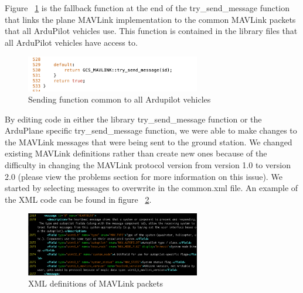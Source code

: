 \documentclass[12pt,journal,compsoc]{IEEEtran}
\begin{document}
Figure ~\ref{fallthrough} is the fallback function at the end of the try\_send\_message function that links the plane MAVLink implementation to the common MAVLink packets that all ArduPilot vehicles use. This function is contained in the library files that all ArduPilot vehicles have access to. 
\begin{figure}[h!]
\hspace*{0cm}
\centering
\includegraphics[width=3in]{Fallthrough.png}
\caption{Sending function common to all Ardupilot vehicles}
\label{fallthrough}
\end{figure}

By editing code in either the library try\_send\_message function or the ArduPlane specific try\_send\_message function, we were able to make changes to the MAVLink messages that were being sent to the ground station. 
We changed existing MAVLink definitions rather than create new ones because of the difficulty in changing the MAVLink protocol version from version 1.0 to version 2.0 (please view the problems section for more information on this issue). We started by selecting messages to overwrite in the common.xml file. An example of the XML code can be found in figure ~\ref{xml}.

\begin{figure}[h!]
\hspace*{0cm}
\centering
\includegraphics[width=3in]{message.png}
\caption{XML definitions of MAVLink packets}
\label{xml}
\end{figure}
\end{document}
